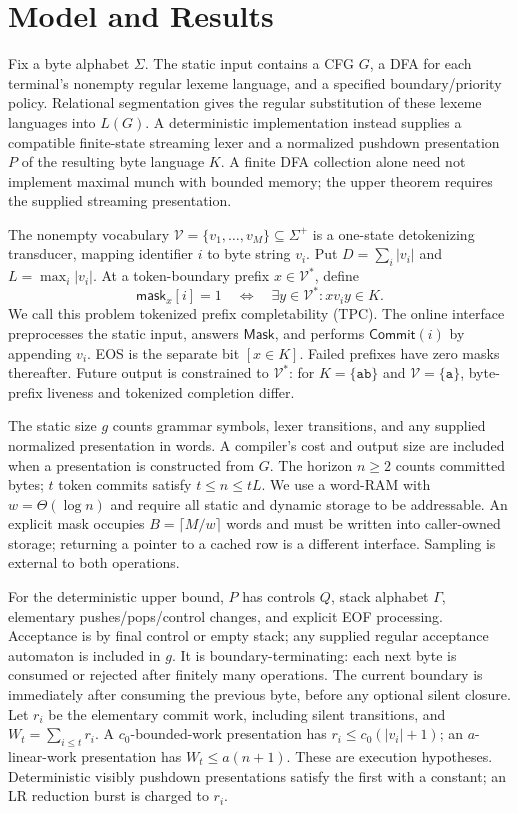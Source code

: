 \documentclass[manuscript,screen,11pt,nonacm]{acmart}
\theoremstyle{definition}\newtheorem{definition}{Definition}
\newcommand{\vocab}{\mathcal V}
\newcommand{\mask}{\mathsf{mask}}
\newcommand{\bn}{\lceil M/w\rceil}
\begin{document}
\section{Model and Results}\label{sec:model}
Fix a byte alphabet $\Sigma$. The static input contains a CFG $G$, a DFA for each terminal's nonempty regular lexeme language, and a specified boundary/priority policy. Relational segmentation gives the regular substitution of these lexeme languages into $L(G)$. A deterministic implementation instead supplies a compatible finite-state streaming lexer and a normalized pushdown presentation $P$ of the resulting byte language $K$. A finite DFA collection alone need not implement maximal munch with bounded memory; the upper theorem requires the supplied streaming presentation.

The nonempty vocabulary $\vocab=\{v_1,\ldots,v_M\}\subseteq\Sigma^+$ is a one-state detokenizing transducer, mapping identifier $i$ to byte string $v_i$. Put $D=\sum_i|v_i|$ and $L=\max_i|v_i|$. At a token-boundary prefix $x\in\vocab^*$, define
\begin{equation}\label{eq:tpc}
 \mask_x[i]=1\quad\Longleftrightarrow\quad\exists y\in\vocab^*: xv_i y\in K.
\end{equation}
We call this problem tokenized prefix completability (TPC). The online interface preprocesses the static input, answers $\mathsf{Mask}$, and performs $\mathsf{Commit}(i)$ by appending $v_i$. EOS is the separate bit $[x\in K]$. Failed prefixes have zero masks thereafter. Future output is constrained to $\vocab^*$: for $K=\{\mathtt{ab}\}$ and $\vocab=\{\mathtt a\}$, byte-prefix liveness and tokenized completion differ.

The static size $g$ counts grammar symbols, lexer transitions, and any supplied normalized presentation in words. A compiler's cost and output size are included when a presentation is constructed from $G$. The horizon $n\ge2$ counts committed bytes; $t$ token commits satisfy $t\le n\le tL$. We use a word-RAM with $w=\Theta(\log n)$ and require all static and dynamic storage to be addressable. An explicit mask occupies $B=\bn$ words and must be written into caller-owned storage; returning a pointer to a cached row is a different interface. Sampling is external to both operations.

For the deterministic upper bound, $P$ has controls $Q$, stack alphabet $\Gamma$, elementary pushes/pops/control changes, and explicit EOF processing. Acceptance is by final control or empty stack; any supplied regular acceptance automaton is included in $g$. It is boundary-terminating: each next byte is consumed or rejected after finitely many operations. The current boundary is immediately after consuming the previous byte, before any optional silent closure. Let $r_i$ be the elementary commit work, including silent transitions, and $W_t=\sum_{i\le t}r_i$. A $c_0$-bounded-work presentation has $r_i\le c_0(|v_i|+1)$; an $a$-linear-work presentation has $W_t\le a(n+1)$. These are execution hypotheses. Deterministic visibly pushdown presentations satisfy the first with a constant; an LR reduction burst is charged to $r_i$.
\end{document}
